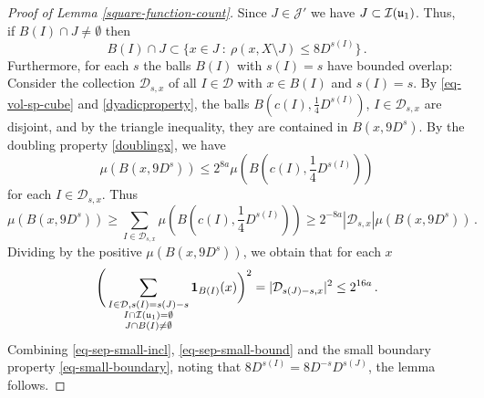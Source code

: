 {    \begin{proof}[Proof of Lemma \ref{square-function-count}]
        Since $J \in \mathcal{J}'$ we have $J \subset {\mathcal{I}}({\mathfrak u}_1)$. Thus, if $B(I) \cap J \ne \emptyset$ then
    \begin{equation}
        \label{eq-sep-small-incl}
        B(I) \cap J \subset \{x \in J \ : \ \rho(x, X \setminus J) \le 8D^{s(I)}\}\,.
    \end{equation}
    Furthermore, for each $s$ the balls $B(I)$ with $s(I) = s$ have bounded overlap: Consider the collection $\mathcal{D}_{s,x}$ of all $I \in \mathcal{D}$ with $x \in B(I)$ and $s(I) = s$. By \eqref{eq-vol-sp-cube} and \eqref{dyadicproperty}, the balls $B(c(I), \frac{1}{4} D^{s(I)})$, $I \in \mathcal{D}_{s,x}$ are disjoint, and by the triangle inequality, they are contained in $B(x, 9 D^{s})$. By the doubling property \eqref{doublingx}, we have
    $$
        \mu(B(x, 9D^{s})) \le 2^{8a} \mu(B(c(I), \frac{1}{4} D^{s(I)}))
    $$
    for each $I \in \mathcal{D}_{s,x}$.
    Thus
    $$
        \mu(B(x, 9D^{s})) \ge \sum_{I \in \mathcal{D}_{s,x}} \mu(B(c(I), \frac{1}{4} D^{s(I)})) \ge 2^{-8a} |\mathcal{D}_{s,x}| \mu(B(x, 9D^{s}))\,.
    $$
    Dividing by the positive $\mu(B(x, 9D^{s}))$, we obtain that for each $x$
    \begin{equation}
        \label{eq-sep-small-bound}
        \Bigg(\sum_{\substack{I \in \mathcal{D}, s(I) = s(J) - s\\ I \cap {\mathcal{I}}({\mathfrak u}_1) = \emptyset\\
        J \cap B(I) \ne \emptyset}} \mathbf{1}_{B(I)}(x) \bigg)^2 = |\mathcal{D}_{s(J) - s,x}|^2 \le 2^{16a} \,.
    \end{equation}
    Combining \eqref{eq-sep-small-incl}, \eqref{eq-sep-small-bound} and the small boundary property \eqref{eq-small-boundary}, noting that $8D^{s(I)}=8D^{-s}D^{s(J)}$, the lemma follows.
\end{proof}


}

